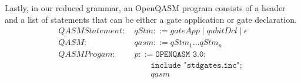 Lastly, in our reduced grammar, an OpenQASM program consists of a header and a list of statements that can be either a gate application or gate declaration.
\begin{align*}
    QASMStatement: \ & qStm::= gateApp \mid qubitDcl \mid \epsilon\\
    QASM: \ & qasm ::= qStm_1 \dots qStm_n\\
    QASMProgam: \ & p ::= \texttt{OPENQASM 3.0;}\\
            & \quad \quad \texttt{include "stdgates.inc";}\\
            & \quad \quad qasm
\end{align*}